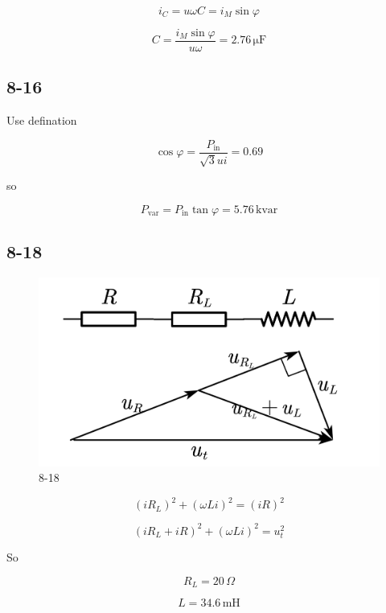 \documentclass[a4paper,11pt]{amsart}
\theoremstyle{definition}
\begin{document}
	$$
	i_C=u\omega C=i_M\sin \varphi 
	$$
	
	$$
	C=\frac{i_M\sin \varphi}{u\omega}=2.76\,\mathrm{\mu F}
	$$
	
	\subsection*{8-16}
	
	Use defination
	
	$$
	\cos\varphi=\dfrac{P_\mathrm{in}}{\sqrt{3}ui}=0.69
	$$
	
	so
	
	$$
	P_\mathrm{var}=P_\mathrm{in}\tan\varphi=5.76\,\mathrm{kvar}
	$$
	
	\subsection*{8-18}
	
	\begin{figure}
		\centering
		\includegraphics[width=0.7\linewidth]{8-18}
		\caption*{8-18}
		\label{fig:8-18}
	\end{figure}
	
	$$
	\left( iR_L \right) ^2+\left( \omega Li \right) ^2=\left( iR \right) ^2
	$$
	
	$$
	\left( iR_L+iR \right) ^2+\left( \omega Li \right) ^2=u_{t}^{2}
	$$
	
	So
	
	$$
	R_L=20\,\Omega
	$$
	
	$$
	L=34.6\,\mathrm{mH}
	$$
	
\end{document}
